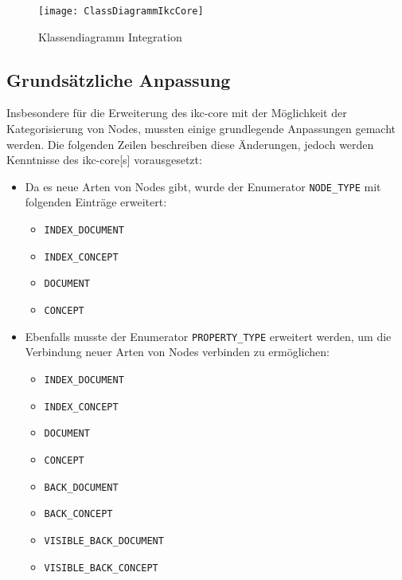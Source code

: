     \begin{figure}[H]
    \centering
    \texttt{[image: ClassDiagrammIkcCore]}
    \caption{Klassendiagramm Integration}
    \label{fig:classDiagrammIkcCore}
    \end{figure}



\subsection{Grundsätzliche Anpassung}


Insbesondere für die Erweiterung des \gls{ikc-core} mit der Möglichkeit der Kategorisierung von Nodes, mussten einige grundlegende Anpassungen gemacht werden. Die folgenden Zeilen beschreiben diese Änderungen, jedoch werden Kenntnisse des \gls{ikc-core}[s] vorausgesetzt:
\begin{itemize}
    \item Da es neue Arten von Nodes gibt, wurde der Enumerator \verb|NODE_TYPE| mit folgenden Einträge erweitert:
    \begin{itemize}
        \item \verb|INDEX_DOCUMENT|\\
        \item \verb|INDEX_CONCEPT|\\
        \item \verb|DOCUMENT|\\
        \item \verb|CONCEPT|\\
    \end{itemize}
    \item Ebenfalls musste der Enumerator \verb|PROPERTY_TYPE| erweitert werden, um die Verbindung neuer Arten von Nodes verbinden zu ermöglichen:
    \begin{itemize}
        \item \verb|INDEX_DOCUMENT|\\
        \item \verb|INDEX_CONCEPT|\\
        \item \verb|DOCUMENT|\\
        \item \verb|CONCEPT|\\
        \item \verb|BACK_DOCUMENT|\\
        \item \verb|BACK_CONCEPT|\\
        \item \verb|VISIBLE_BACK_DOCUMENT|\\
        \item \verb|VISIBLE_BACK_CONCEPT|\\
    \end{itemize}    
\end{itemize}


